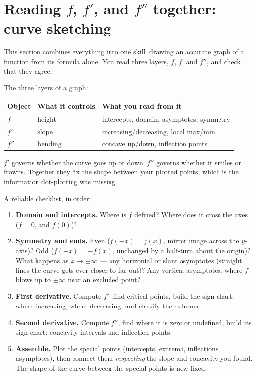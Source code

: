 \section{Reading $f$, $f'$, and $f''$ together: curve sketching}

This section combines everything into one skill: drawing an accurate graph of a
function from its formula alone. You read three layers, $f$, $f'$ and $f''$, and
check that they agree.

\begin{focusbox}
The three layers of a graph:
\begin{center}
\begin{tabular}{lll}
\toprule
\textbf{Object} & \textbf{What it controls} & \textbf{What you read from it}\\
\midrule
$f$ & height & intercepts, domain, asymptotes, symmetry\\
$f'$ & slope & increasing/decreasing, local max/min\\
$f''$ & bending & concave up/down, inflection points\\
\bottomrule
\end{tabular}
\end{center}
$f'$ governs whether the curve goes up or down. $f''$ governs whether it smiles or
frowns. Together they fix the shape between your plotted points, which is
the information dot-plotting was missing.
\end{focusbox}

A reliable checklist, in order:

\begin{enumerate}
\item \textbf{Domain and intercepts.} Where is $f$ defined? Where does it cross the
axes ($f=0$, and $f(0)$)?
\item \textbf{Symmetry and ends.} Even ($f(-x)=f(x)$, mirror image across the
$y$-axis)? Odd ($f(-x)=-f(x)$, unchanged by a half-turn about the origin)? What
happens as $x\to\pm\infty$ --- any horizontal or slant asymptotes (straight lines
the curve gets ever closer to far out)? Any vertical asymptotes, where $f$ blows
up to $\pm\infty$ near an excluded point?
\item \textbf{First derivative.} Compute $f'$, find critical points, build the sign
chart: where increasing, where decreasing, and classify the extrema.
\item \textbf{Second derivative.} Compute $f''$, find where it is zero or
undefined, build its sign chart: concavity intervals and inflection points.
\item \textbf{Assemble.} Plot the special points (intercepts, extrema,
inflections, asymptotes), then connect them \emph{respecting} the slope and
concavity you found. The shape of the curve between the special points is now
fixed.
\end{enumerate}

